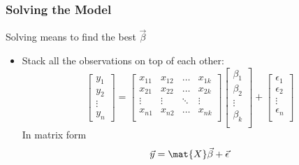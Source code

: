 \documentclass[mathserif, xcolor=table, svgnames]{beamer}
\begin{document}
\begin{frame}
  \frametitle{Solving the Model}
  Solving means to find the best $\vec{\beta}$
  \begin{itemize}
  \item Stack all the observations on top of each other:
    \begin{equation*}
      \begin{bmatrix}
        y_{1} \\ y_{2} \\ \vdots \\ y_{n}
      \end{bmatrix}
      =
      \begin{bmatrix}
        x_{11} & x_{12} & \hdots & x_{1k} \\
        x_{21} & x_{22} & \hdots & x_{2k} \\
        \vdots&\vdots & \ddots & \vdots\\
        x_{n1} & x_{n2} & \hdots & x_{nk} \\
      \end{bmatrix}
      \begin{bmatrix}
        \beta_{1} \\ \beta_{2} \\ \vdots \\ \beta_{k}\\
      \end{bmatrix}
      +
      \begin{bmatrix}
        \epsilon_{1}\\ \epsilon_{2} \\ \vdots \\ \epsilon_{n}\\
      \end{bmatrix}
    \end{equation*}
    In matrix form
    \begin{equation*}
      \vec{y} = \mat{X}\vec{\beta} + \vec{\epsilon}
    \end{equation*}
  \end{itemize}
\end{frame}
\end{document}
